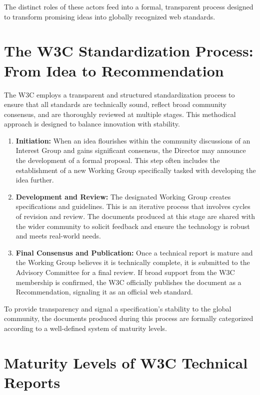 \documentclass{scrbook}
\begin{document}
The distinct roles of these actors feed into a formal, transparent process designed to transform promising ideas into globally recognized web standards.

\chapter{The W3C Standardization Process: From Idea to Recommendation}

The W3C employs a transparent and structured standardization process to ensure that all standards are technically sound, reflect broad community consensus, and are thoroughly reviewed at multiple stages. This methodical approach is designed to balance innovation with stability.

\begin{enumerate}
    \item 
    \textbf{Initiation:} When an idea flourishes within the community discussions of an Interest Group and gains significant consensus, the Director may announce the development of a formal proposal. This step often includes the establishment of a new Working Group specifically tasked with developing the idea further.

    \item 
    \textbf{Development and Review:} The designated Working Group creates specifications and guidelines. This is an iterative process that involves cycles of revision and review. The documents produced at this stage are shared with the wider community to solicit feedback and ensure the technology is robust and meets real-world needs.

    \item 
    \textbf{Final Consensus and Publication:} Once a technical report is mature and the Working Group believes it is technically complete, it is submitted to the Advisory Committee for a final review. If broad support from the W3C membership is confirmed, the W3C officially publishes the document as a Recommendation, signaling it as an official web standard.
\end{enumerate}

To provide transparency and signal a specification's stability to the global community, the documents produced during this process are formally categorized according to a well-defined system of maturity levels.

\chapter{Maturity Levels of W3C Technical Reports}
\end{document}
